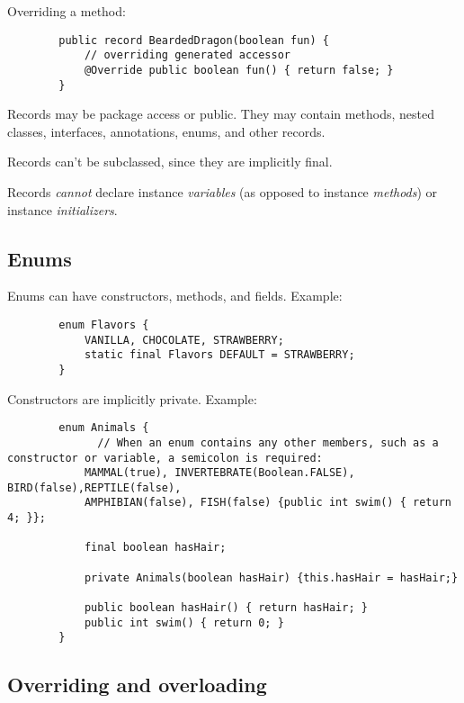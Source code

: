 \documentclass{scrartcl}
\begin{document}
    Overriding a method:

     \begin{lstlisting}
        public record BeardedDragon(boolean fun) {
            // overriding generated accessor
            @Override public boolean fun() { return false; }
        }
    \end{lstlisting}

    Records may be package access or public. They may contain methods, nested classes, interfaces, annotations, enums, and other records.

    Records can't be subclassed, since they are implicitly final.

    Records \textit{cannot} declare instance \textit{variables} (as opposed to instance \textit{methods}) or instance \textit{initializers}.

\subsection{Enums}

    Enums can have constructors, methods, and fields. Example:

        \begin{lstlisting}
        enum Flavors {
            VANILLA, CHOCOLATE, STRAWBERRY;
            static final Flavors DEFAULT = STRAWBERRY;
        }
    \end{lstlisting}

    Constructors are implicitly private. Example:

     \begin{lstlisting}
        enum Animals {
              // When an enum contains any other members, such as a constructor or variable, a semicolon is required:
            MAMMAL(true), INVERTEBRATE(Boolean.FALSE), BIRD(false),REPTILE(false),
            AMPHIBIAN(false), FISH(false) {public int swim() { return 4; }};

            final boolean hasHair;

            private Animals(boolean hasHair) {this.hasHair = hasHair;}

            public boolean hasHair() { return hasHair; }
            public int swim() { return 0; }
        }

    \end{lstlisting}

\subsection{Overriding and overloading}
\end{document}
